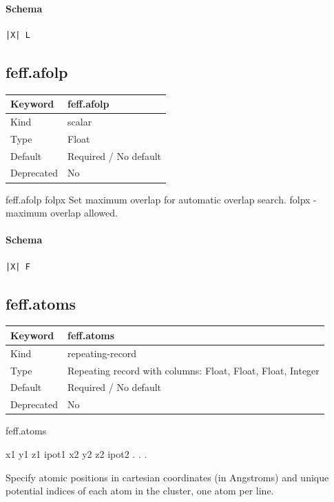 \documentclass[11pt]{article}
\begin{document}
{{\paragraph{Schema}
\begin{Verbatim}
|X| L
\end{Verbatim}

\subsection{feff.afolp}
\label{kw:feff-afolp}
\begin{longtable}{|p{1.5in}|p{4.5in}|}
\hline
Keyword & feff.afolp \\
\hline
Kind & scalar \\
\hline
Type & Float \\
\hline
Default & Required / No default \\
\hline
Deprecated & No \\
\hline
\end{longtable}
 feff.afolp{ folpx }
 Set maximum overlap for automatic overlap search.
 folpx - maximum overlap allowed.

\paragraph{Schema}
\begin{Verbatim}
|X| F
\end{Verbatim}

\subsection{feff.atoms}
\label{kw:feff-atoms}
\begin{longtable}{|p{1.5in}|p{4.5in}|}
\hline
Keyword & feff.atoms \\
\hline
Kind & repeating-record \\
\hline
Type & Repeating record with columns: Float, Float, Float, Integer \\
\hline
Default & Required / No default \\
\hline
Deprecated & No \\
\hline
\end{longtable}

 feff.atoms
 {
 x1  y1  z1 ipot1
 x2  y2  z2 ipot2
 .
 .
 .

 Specify atomic positions in cartesian coordinates (in Angstroms) and
 unique potential indices of each atom in the cluster, one atom per line.

}}}
\end{document}
